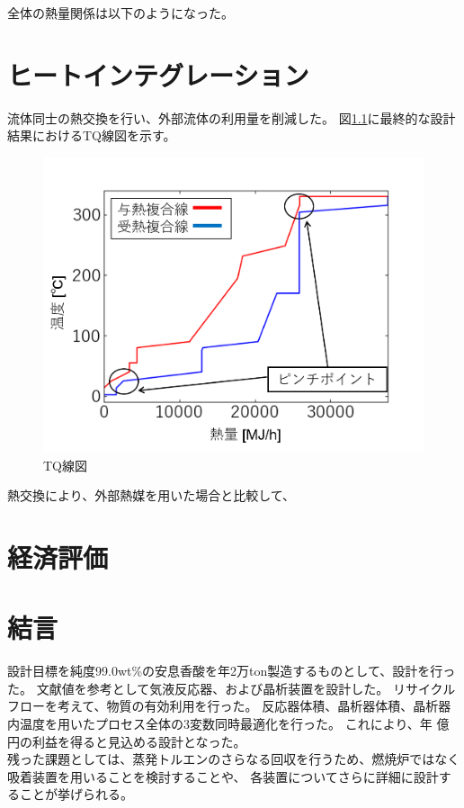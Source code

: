 \documentclass[a4j]{jsreport}
\begin{document}
全体の熱量関係は以下のようになった。

\newpage
\chapter{ヒートインテグレーション}
流体同士の熱交換を行い、外部流体の利用量を削減した。
図\ref{TQ線図}に最終的な設計結果におけるTQ線図を示す。
\begin{figure}[h]
    \label{TQ線図}
    \begin{center}
        \includegraphics[scale=0.7]{TQdiagram.png}
        \caption{TQ線図}
    \end{center}
\end{figure}

熱交換により、外部熱媒を用いた場合と比較して、

\newpage
\chapter{経済評価}

\newpage
\chapter{結言}
設計目標を純度99.0wt\%の安息香酸を年2万ton製造するものとして、設計を行った。
文献値を参考として気液反応器、および晶析装置を設計した。
リサイクルフローを考えて、物質の有効利用を行った。
反応器体積、晶析器体積、晶析器内温度を用いたプロセス全体の3変数同時最適化を行った。
これにより、年 億円の利益を得ると見込める設計となった。\\
残った課題としては、蒸発トルエンのさらなる回収を行うため、燃焼炉ではなく吸着装置を用いることを検討することや、
各装置についてさらに詳細に設計することが挙げられる。
\end{document}
